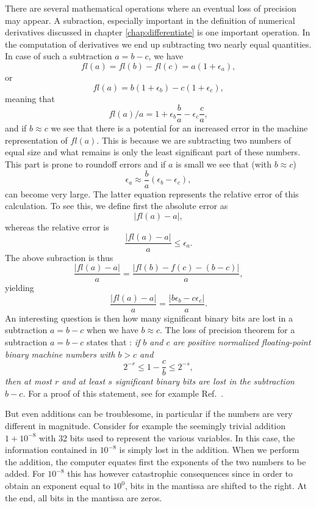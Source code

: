 There are several mathematical operations where an eventual loss of precision  may appear. 
A subraction, especially important in the definition of numerical derivatives discussed in
chapter \ref{chap:differentiate} is one important operation. 
In the computation of derivatives we end up subtracting
two nearly equal quantities.
In case of such a subtraction $a=b-c$, we have  
\[
   fl(a)=fl(b)-fl(c) = a(1+\epsilon_a),
\]
or
%
\[ 
   fl(a)=b(1+\epsilon_b)-c(1+\epsilon_c),
\] 
%
meaning that
%
\[ 
   fl(a)/a=1+\epsilon_b\frac{b}{a}- \epsilon_c\frac{c}{a},
\]
%
and if $b\approx c$ we see that there is a potential for an increased
error in the machine representation of $fl(a)$. This is because we are subtracting two numbers of equal
size and what remains is only the least significant part of these
numbers. This part is prone to roundoff errors and if $a$ is small we
see that (with $b \approx c$)
%
\[ 
  \epsilon_a \approx \frac{b}{a}(\epsilon_b- \epsilon_c),
\]
%
can become very large.
The latter equation represents the relative error of this calculation.
To see this, we define first
the absolute error as 
\[
   |fl(a)-a|,
\]
whereas the relative error is 
\[
   \frac{ |fl(a)-a|}{a} \le \epsilon_a.
\]
The above subraction is thus
\[
   \frac{ |fl(a)-a|}{a}=\frac{ |fl(b)-f(c)-(b-c)|}{a},
\]
yielding
\[
   \frac{ |fl(a)-a|}{a}=\frac{ |b\epsilon_b- c\epsilon_c|}{a}.
\]
An interesting question is then how many significant binary bits are lost in a subtraction 
$a=b-c$  when we have $b\approx c$. The loss of precision theorem for a subtraction 
$a=b-c$ states that \cite{kincaid}: {\em if  $b$ and $c$ are positive normalized floating-point binary
machine numbers with $b > c$ and}
\begin{equation}\label{eq:lossofprecision}
2^{-r} \le 1-\frac{c}{b}\le 2^{-s},
\end{equation}
{\em then at most $r$ and at least $s$ significant binary bits are lost in the subtraction $b-c$.} 
For a proof of this statement, see for example Ref.~\cite{kincaid}.



But even additions can be troublesome, in particular if the numbers are very different in magnitude.
Consider for example the seemingly trivial 
addition $1+10^{-8}$ with 32 bits used to represent the various variables. 
In this case, the information contained
in $10^{-8}$ is simply lost in the addition. When we perform the addition, 
the computer equates first the exponents of the two numbers to be added.
For  $10^{-8}$ this has however catastrophic consequences since in order to
obtain an exponent equal to $10^0$, bits in the mantissa are shifted to the right.
At the end, all bits in the mantissa are zeros.



